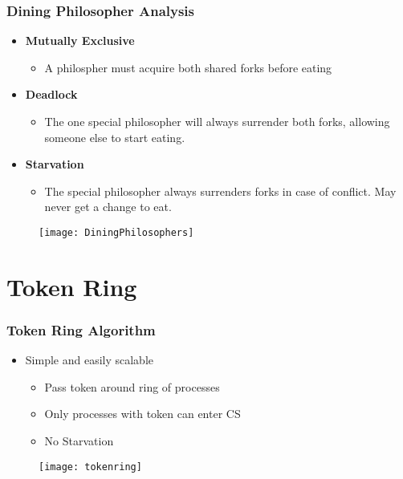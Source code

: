 \documentclass[t, pdftex]{beamer}
\begin{document}
\begin{frame}[c]
  \frametitle{Dining Philosopher Analysis}
  \begin{multicols}{2}
    \begin{itemize}
      \item \textbf{Mutually Exclusive}
      \begin{itemize}
        \item A philospher must acquire both shared forks before eating
      \end{itemize}
      \item \textbf{Deadlock}
      \begin{itemize}
        \item The one special philosopher will always surrender both forks, allowing someone else to start eating.
      \end{itemize}
      \item \textbf{Starvation}
      \begin{itemize}
        \item The special philosopher always surrenders forks in case of conflict. May never get a change to eat.
      \end{itemize}
    \end{itemize}
    \columnbreak
    \begin{figure}
      \begin{minipage}{.5\textwidth}
        \centering
        \texttt{[image: DiningPhilosophers]}
      \end{minipage}
    \end{figure}
  \end{multicols}
\end{frame}



\section{Token Ring}
\begin{frame}[c]
    \frametitle{Token Ring Algorithm}
    \begin{itemize}
		\item Simple and easily scalable
		 \begin{itemize}
          \item Pass token around ring of processes
          \item Only processes with token can enter CS
		  \item No Starvation
        \end{itemize}
    \end{itemize}
	
	
 \begin{figure}
	 \begin{minipage}{.5\textwidth}
      \centering
      \texttt{[image: tokenring]}
      \label{fig:Token Ring}
    \end{minipage}
\end{figure}
	
\end{frame}
\end{document}
